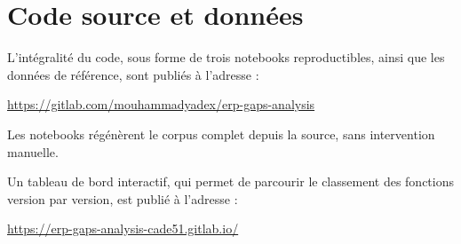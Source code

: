 \documentclass[11pt,a4paper]{article}
\begin{document}
\section{Code source et données}

L'intégralité du code, sous forme de trois notebooks reproductibles, ainsi que
les données de référence, sont publiés à l'adresse :

\begin{center}
\url{https://gitlab.com/mouhammadyadex/erp-gaps-analysis}
\end{center}

Les notebooks régénèrent le corpus complet depuis la source, sans intervention
manuelle.

Un tableau de bord interactif, qui permet de parcourir le classement des
fonctions version par version, est publié à l'adresse :

\begin{center}
\url{https://erp-gaps-analysis-cade51.gitlab.io/}
\end{center}

\printbibliography
\end{document}
